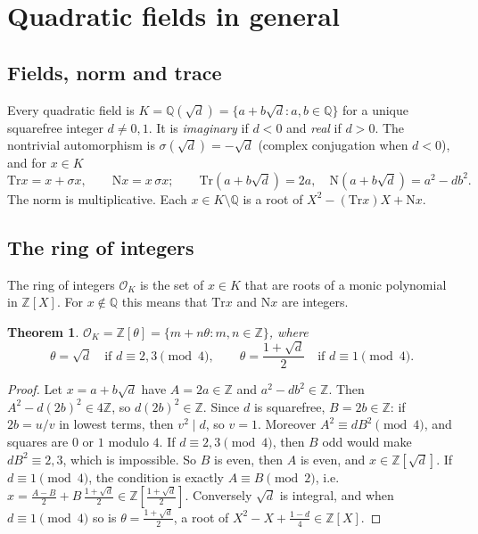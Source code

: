 \documentclass[11pt]{article}
\numberwithin{equation}{section}
\newcommand{\N}{\mathrm N}
\newcommand{\Tr}{\mathrm{Tr}}
\newcommand{\Q}{\mathbb Q}
\newcommand{\Z}{\mathbb Z}
\newcommand{\OK}{\mathcal O_K}
\newtheorem{theorem}{Theorem}
\theoremstyle{definition}
\theoremstyle{remark}
\begin{document}
\tableofcontents

\section{Quadratic fields in general}\label{sec:general}

\subsection{Fields, norm and trace}
Every quadratic field is $K=\Q(\sqrt d)=\{a+b\sqrt d:a,b\in\Q\}$ for a unique squarefree
integer $d\ne0,1$. It is \emph{imaginary} if $d<0$ and \emph{real} if $d>0$. The nontrivial
automorphism is $\sigma(\sqrt d)=-\sqrt d$ (complex conjugation when $d<0$), and for $x\in K$
\begin{equation}\label{eq:normtrace}
 \Tr x=x+\sigma x,\qquad \N x=x\,\sigma x;\qquad
 \Tr(a+b\sqrt d)=2a,\quad \N(a+b\sqrt d)=a^2-db^2 .
\end{equation}
The norm is multiplicative. Each $x\in K\setminus\Q$ is a root of $X^2-(\Tr x)X+\N x$.

\subsection{The ring of integers}
The ring of integers $\OK$ is the set of $x\in K$ that are roots of a monic polynomial
in $\Z[X]$. For $x\notin\Q$ this means that $\Tr x$ and $\N x$ are integers.

\begin{theorem}\label{thm:integers}
$\OK=\Z[\theta]=\{m+n\theta:m,n\in\Z\}$, where
\begin{equation}\label{eq:theta}
 \theta=\sqrt d\quad\text{if }d\equiv2,3\pmod4,\qquad
 \theta=\frac{1+\sqrt d}2\quad\text{if }d\equiv1\pmod4 .
\end{equation}
\end{theorem}

\begin{proof}
Let $x=a+b\sqrt d$ have $A=2a\in\Z$ and $a^2-db^2\in\Z$. Then $A^2-d(2b)^2\in4\Z$, so
$d(2b)^2\in\Z$. Since $d$ is squarefree, $B=2b\in\Z$: if $2b=u/v$ in lowest terms, then
$v^2\mid d$, so $v=1$. Moreover $A^2\equiv dB^2\pmod 4$, and squares are $0$ or $1$ modulo $4$.
If $d\equiv2,3\pmod4$, then $B$ odd would make $dB^2\equiv2,3$, which is impossible. So $B$
is even, then $A$ is even, and $x\in\Z[\sqrt d]$. If $d\equiv1\pmod4$, the condition is
exactly $A\equiv B\pmod2$, i.e.\ $x=\frac{A-B}2+B\,\frac{1+\sqrt d}2\in\Z[\frac{1+\sqrt d}2]$.
Conversely $\sqrt d$ is integral, and when $d\equiv1\pmod4$ so is $\theta=\frac{1+\sqrt d}2$, a root of
$X^2-X+\frac{1-d}4\in\Z[X]$.
\end{proof}
\end{document}
